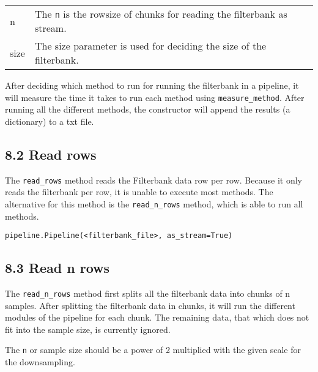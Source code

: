 \documentclass[]{article}
\begin{document}
\begin{longtable}[]{@{}ll@{}}
\begin{minipage}[t]{0.41\columnwidth}\raggedright\strut
n\strut
\end{minipage} & \begin{minipage}[t]{0.41\columnwidth}\raggedright\strut
The \texttt{n} is the rowsize of chunks for reading the filterbank as
stream.\strut
\end{minipage}\tabularnewline
\begin{minipage}[t]{0.41\columnwidth}\raggedright\strut
size\strut
\end{minipage} & \begin{minipage}[t]{0.41\columnwidth}\raggedright\strut
The size parameter is used for deciding the size of the
filterbank.\strut
\end{minipage}\tabularnewline
\bottomrule
\end{longtable}

After deciding which method to run for running the filterbank in a
pipeline, it will measure the time it takes to run each method using
\texttt{measure\_method}. After running all the different methods, the
constructor will append the results (a dictionary) to a txt file.

\subsection{8.2 Read rows}\label{read-rows}

The \texttt{read\_rows} method reads the Filterbank data row per row.
Because it only reads the filterbank per row, it is unable to execute
most methods. The alternative for this method is the
\texttt{read\_n\_rows} method, which is able to run all methods.

\begin{verbatim}
pipeline.Pipeline(<filterbank_file>, as_stream=True)
\end{verbatim}

\subsection{8.3 Read n rows}\label{read-n-rows}

The \texttt{read\_n\_rows} method first splits all the filterbank data
into chunks of n samples. After splitting the filterbank data in chunks,
it will run the different modules of the pipeline for each chunk. The
remaining data, that which does not fit into the sample size, is
currently ignored.

The \texttt{n} or sample size should be a power of 2 multiplied with the
given scale for the downsampling.
\end{document}
